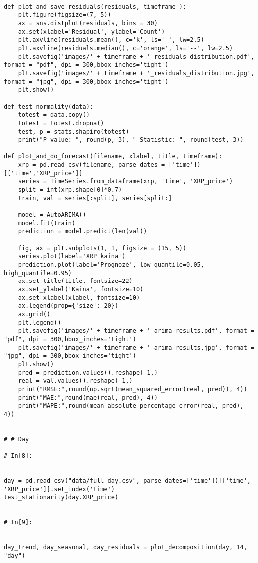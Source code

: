 \documentclass[12pt,a4paper]{article}
\begin{document}
\begin{lstlisting}[breaklines]
    
def plot_and_save_residuals(residuals, timeframe ):
    plt.figure(figsize=(7, 5))
    ax = sns.distplot(residuals, bins = 30)
    ax.set(xlabel='Residual', ylabel='Count')
    plt.axvline(residuals.mean(), c='k', ls='-', lw=2.5)
    plt.axvline(residuals.median(), c='orange', ls='--', lw=2.5)
    plt.savefig('images/' + timeframe + '_residuals_distribution.pdf', format = "pdf", dpi = 300,bbox_inches='tight')
    plt.savefig('images/' + timeframe + '_residuals_distribution.jpg', format = "jpg", dpi = 300,bbox_inches='tight')
    plt.show()

def test_normality(data):
    totest = data.copy()
    totest = totest.dropna()
    test, p = stats.shapiro(totest)
    print("P value: ", round(p, 3), " Statistic: ", round(test, 3))

def plot_and_do_forecast(filename, xlabel, title, timeframe):
    xrp = pd.read_csv(filename, parse_dates = ['time'])[['time','XRP_price']]
    series = TimeSeries.from_dataframe(xrp, 'time', 'XRP_price')
    split = int(xrp.shape[0]*0.7)
    train, val = series[:split], series[split:]
    
    model = AutoARIMA()
    model.fit(train)
    prediction = model.predict(len(val))
    
    fig, ax = plt.subplots(1, 1, figsize = (15, 5))
    series.plot(label='XRP kaina')
    prediction.plot(label='Prognozė', low_quantile=0.05, high_quantile=0.95)
    ax.set_title(title, fontsize=22)
    ax.set_ylabel('Kaina', fontsize=10)
    ax.set_xlabel(xlabel, fontsize=10)
    ax.legend(prop={'size': 20})
    ax.grid()
    plt.legend()
    plt.savefig('images/' + timeframe + '_arima_results.pdf', format = "pdf", dpi = 300,bbox_inches='tight')
    plt.savefig('images/' + timeframe + '_arima_results.jpg', format = "jpg", dpi = 300,bbox_inches='tight')
    plt.show()
    pred = prediction.values().reshape(-1,)
    real = val.values().reshape(-1,)
    print("RMSE:",round(np.sqrt(mean_squared_error(real, pred)), 4))
    print("MAE:",round(mae(real, pred), 4))
    print("MAPE:",round(mean_absolute_percentage_error(real, pred), 4))


# # Day

# In[8]:


day = pd.read_csv("data/full_day.csv", parse_dates=['time'])[['time', 'XRP_price']].set_index('time')
test_stationarity(day.XRP_price)


# In[9]:


day_trend, day_seasonal, day_residuals = plot_decomposition(day, 14, "day")



\end{lstlisting}
\end{document}
